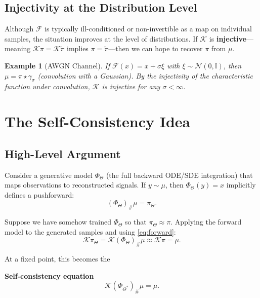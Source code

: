 \documentclass[12pt,fleqn]{article}
\numberwithin{equation}{section}
\newtheorem{example}{Example}
\newcommand{\N}{\mathcal{N}}
\newcommand{\I}{\mathbb{I}}
\begin{document}
\subsection{Injectivity at the Distribution Level}
Although $\mathcal F$ is typically ill-conditioned or non-invertible as a map on individual samples, the situation improves at the level of distributions. If $\mathcal K$ is \textbf{injective}---meaning $\mathcal K \pi = \mathcal K \tilde\pi$ implies $\pi = \tilde\pi$---then we can hope to recover $\pi$ from $\mu$.

\begin{example}[AWGN Channel]
If $\mathcal F(x) = x + \sigma \xi$ with $\xi \sim \N(0, \I)$, then $\mu = \pi \star \gamma_\sigma$ (convolution with a Gaussian). By the injectivity of the characteristic function under convolution, $\mathcal K$ is injective for any $\sigma < \infty$.
\end{example}

\section{The Self-Consistency Idea}

\subsection{High-Level Argument}

Consider a generative model $\Phi_\Theta$ (the full backward ODE/SDE integration) that maps observations to reconstructed signals. If $y \sim \mu$, then $\Phi_\Theta(y) = x$ implicitly defines a pushforward:
\begin{equation}
	(\Phi_\Theta)_\# \mu = \pi_\Theta. \label{eq:gen_push}
\end{equation}

Suppose we have somehow trained $\Phi_\Theta$ so that $\pi_\Theta \approx \pi$. Applying the forward model to the generated samples and using \eqref{eq:forward}:
\begin{equation}
	\mathcal K \pi_\Theta = \mathcal K (\Phi_\Theta)_\# \mu \approx \mathcal K \pi = \mu.
\end{equation}

At a fixed point, this becomes the 
\begin{keybox}
\textbf{Self-consistency equation}
\begin{equation}
	\mathcal K (\Phi_{\Theta^*})_\# \mu = \mu. \label{eq:selfconsist}
\end{equation}
\end{keybox}
\end{document}

